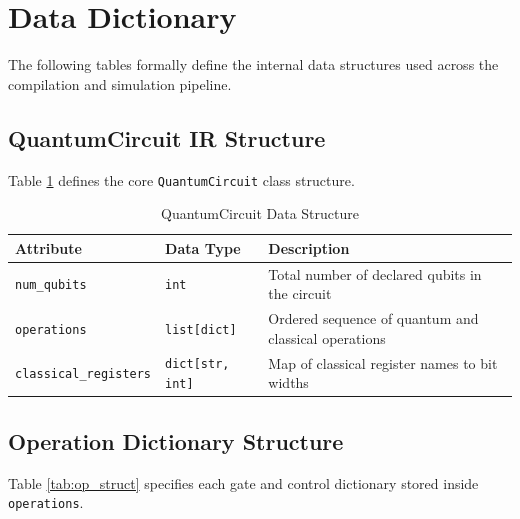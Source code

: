 \section{Data Dictionary}
The following tables formally define the internal data structures used across the compilation and simulation pipeline.

\subsection{QuantumCircuit IR Structure}
Table \ref{tab:qc_struct} defines the core \texttt{QuantumCircuit} class structure.

\begin{table}[H]
\centering
\caption{QuantumCircuit Data Structure}
\label{tab:qc_struct}
\begin{tabular}{|p{3.5cm}|p{2.5cm}|p{7.5cm}|}
\hline
\textbf{Attribute} & \textbf{Data Type} & \textbf{Description} \\
\hline
\texttt{num\_qubits} & \texttt{int} & Total number of declared qubits in the circuit \\
\hline
\texttt{operations} & \texttt{list[dict]} & Ordered sequence of quantum and classical operations \\
\hline
\texttt{classical\_registers} & \texttt{dict[str, int]} & Map of classical register names to bit widths \\
\hline
\end{tabular}
\end{table}

\subsection{Operation Dictionary Structure}
Table \ref{tab:op_struct} specifies each gate and control dictionary stored inside \texttt{operations}.

